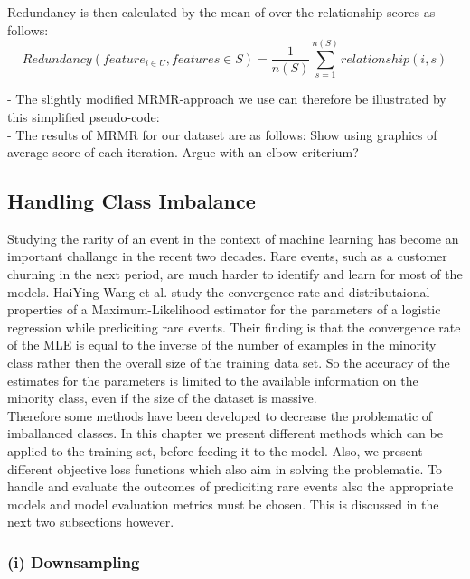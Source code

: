 \documentclass[12pt,titlepage]{article}
\begin{document}
Redundancy is then calculated by the mean of over the relationship scores as follows: \\

\begin{equation} \label{redundancy}
    Redundancy(feature_{i \in U}, features \in S) = \frac{1}{n(S)} \sum_{s=1}^{n(S)} relationship(i, s)
\end{equation}

- The slightly modified MRMR-approach we use can therefore be illustrated by this simplified pseudo-code: \\
- The results of MRMR for our dataset are as follows: Show using graphics of average score of each iteration. Argue with an elbow criterium? \\

\subsection{Handling Class Imbalance} \par

Studying the rarity of an event in the context of machine learning has become an important challange in the recent two decades. Rare events, such as a customer churning in the next period, are much harder to identify and learn for most of the models. HaiYing Wang et al. \cite{convergence_rareevents} study the convergence rate and distributaional properties of a Maximum-Likelihood estimator for the parameters of a logistic regression while prediciting rare events. Their finding is that the convergence rate of the MLE is equal to the inverse of the number of examples in the minority class rather then the overall size of the training data set. So the accuracy of the estimates for the parameters is limited to the available information on the minority class, even if the size of the dataset is massive. \\
Therefore some methods have been developed to decrease the problematic of imballanced classes. In this chapter we present different methods which can be applied to the training set, before feeding it to the model. Also, we present different objective loss functions which also aim in solving the problematic. To handle and evaluate the outcomes
of prediciting rare events also the appropriate models and model evaluation metrics must be chosen. This is discussed in the next two subsections however. \\

\subsubsection*{(i) Downsampling}
\end{document}
